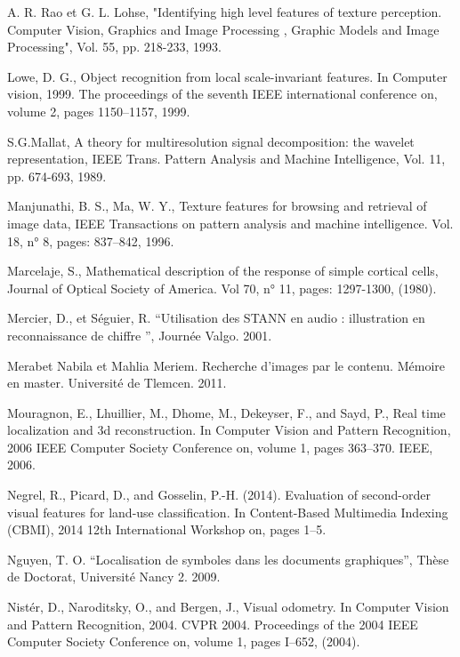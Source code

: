 \documentclass[
openany,
11pt, %
french, %
singlespacing, %
headsepline, %
]{MastersDoctoralThesis} %
\begin{document}
\begin{thebibliography}{widest entry}
	 A. R. Rao et G. L. Lohse, "Identifying high level features of texture perception. Computer Vision, Graphics and Image Processing , Graphic Models and Image Processing", Vol. 55, pp. 218-233, 1993.
	
	  Lowe, D. G., Object recognition from local scale-invariant features. In Computer vision, 1999. The proceedings of the seventh IEEE international conference on, volume 2, pages 1150–1157, 1999.
	
	 S.G.Mallat, A theory for multiresolution signal decomposition: the wavelet representation, IEEE Trans. Pattern Analysis and Machine Intelligence, Vol. 11, pp. 674-693, 1989.
	
	 Manjunathi, B. S., Ma, W. Y., Texture features for browsing and retrieval of image data, IEEE Transactions on pattern analysis and machine intelligence. Vol. 18, n° 8, pages: 837–842, 1996.
	
	 Marcelaje, S., Mathematical description of the response of simple cortical cells, Journal of Optical Society of America. Vol 70, n° 11, pages: 1297-1300, (1980).
	
	
	 Mercier, D., et Séguier, R. “Utilisation des STANN en audio : illustration en reconnaissance de chiffre ”, Journée Valgo. 2001.
	
	 Merabet Nabila et Mahlia Meriem. Recherche d’images par le contenu. Mémoire en master. Université de Tlemcen. 2011.
	
	 Mouragnon, E., Lhuillier, M., Dhome, M., Dekeyser, F., and Sayd, P., Real time localization and 3d reconstruction. In Computer Vision and Pattern Recognition, 2006 IEEE Computer Society Conference on, volume 1, pages 363–370. IEEE, 2006.
	
	 Negrel, R., Picard, D., and Gosselin, P.-H. (2014). Evaluation of second-order visual features for land-use classification. In Content-Based Multimedia Indexing (CBMI), 2014 12th International Workshop on, pages 1–5.
	
	 Nguyen, T. O. “Localisation de symboles dans les documents graphiques”, Thèse de Doctorat, Université Nancy 2. 2009.
	
	  Nistér, D., Naroditsky, O., and Bergen, J., Visual odometry. In Computer Vision and Pattern Recognition, 2004. CVPR 2004. Proceedings of the 2004 IEEE Computer Society Conference on, volume 1, pages I–652, (2004).
	

\end{thebibliography}
\end{document}
